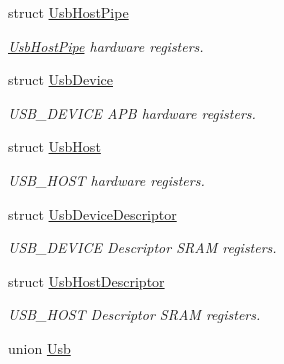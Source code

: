 \begin{DoxyCompactItemize}
struct \mbox{\hyperlink{struct_usb_host_pipe}{Usb\+Host\+Pipe}}
\begin{DoxyCompactList}\small\item\em \mbox{\hyperlink{struct_usb_host_pipe}{Usb\+Host\+Pipe}} hardware registers. \end{DoxyCompactList}\item 
struct \mbox{\hyperlink{struct_usb_device}{Usb\+Device}}
\begin{DoxyCompactList}\small\item\em U\+S\+B\+\_\+\+D\+E\+V\+I\+CE A\+PB hardware registers. \end{DoxyCompactList}\item 
struct \mbox{\hyperlink{struct_usb_host}{Usb\+Host}}
\begin{DoxyCompactList}\small\item\em U\+S\+B\+\_\+\+H\+O\+ST hardware registers. \end{DoxyCompactList}\item 
struct \mbox{\hyperlink{struct_usb_device_descriptor}{Usb\+Device\+Descriptor}}
\begin{DoxyCompactList}\small\item\em U\+S\+B\+\_\+\+D\+E\+V\+I\+CE Descriptor S\+R\+AM registers. \end{DoxyCompactList}\item 
struct \mbox{\hyperlink{struct_usb_host_descriptor}{Usb\+Host\+Descriptor}}
\begin{DoxyCompactList}\small\item\em U\+S\+B\+\_\+\+H\+O\+ST Descriptor S\+R\+AM registers. \end{DoxyCompactList}\item 
union \mbox{\hyperlink{union_usb}{Usb}}
\end{DoxyCompactItemize}
